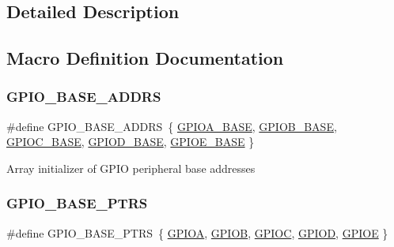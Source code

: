 \subsection{Detailed Description}


\subsection{Macro Definition Documentation}
\mbox{\label{group___g_p_i_o___register___masks_ga7f97513de5235b3600dc07bf327fe315}} 
\subsubsection{\texorpdfstring{G\+P\+I\+O\+\_\+\+B\+A\+S\+E\+\_\+\+A\+D\+D\+RS}{GPIO\_BASE\_ADDRS}}
{\footnotesize\ttfamily \#define G\+P\+I\+O\+\_\+\+B\+A\+S\+E\+\_\+\+A\+D\+D\+RS~\{ \mbox{\hyperlink{group___g_p_i_o___register___masks_gad7723846cc5db8e43a44d78cf21f6efa}{G\+P\+I\+O\+A\+\_\+\+B\+A\+SE}}, \mbox{\hyperlink{group___g_p_i_o___register___masks_gac944a89eb789000ece920c0f89cb6a68}{G\+P\+I\+O\+B\+\_\+\+B\+A\+SE}}, \mbox{\hyperlink{group___g_p_i_o___register___masks_ga26f267dc35338eef219544c51f1e6b3f}{G\+P\+I\+O\+C\+\_\+\+B\+A\+SE}}, \mbox{\hyperlink{group___g_p_i_o___register___masks_ga1a93ab27129f04064089616910c296ec}{G\+P\+I\+O\+D\+\_\+\+B\+A\+SE}}, \mbox{\hyperlink{group___g_p_i_o___register___masks_gab487b1983d936c4fee3e9e88b95aad9d}{G\+P\+I\+O\+E\+\_\+\+B\+A\+SE}} \}}

Array initializer of G\+P\+IO peripheral base addresses \mbox{\label{group___g_p_i_o___register___masks_gad0f7206167a584b1e75a81a5c30fa1c2}} 
\subsubsection{\texorpdfstring{G\+P\+I\+O\+\_\+\+B\+A\+S\+E\+\_\+\+P\+T\+RS}{GPIO\_BASE\_PTRS}}
{\footnotesize\ttfamily \#define G\+P\+I\+O\+\_\+\+B\+A\+S\+E\+\_\+\+P\+T\+RS~\{ \mbox{\hyperlink{group___g_p_i_o___register___masks_gac485358099728ddae050db37924dd6b7}{G\+P\+I\+OA}}, \mbox{\hyperlink{group___g_p_i_o___register___masks_ga68b66ac73be4c836db878a42e1fea3cd}{G\+P\+I\+OB}}, \mbox{\hyperlink{group___g_p_i_o___register___masks_ga2dca03332d620196ba943bc2346eaa08}{G\+P\+I\+OC}}, \mbox{\hyperlink{group___g_p_i_o___register___masks_ga7580b1a929ea9df59725ba9c18eba6ac}{G\+P\+I\+OD}}, \mbox{\hyperlink{group___g_p_i_o___register___masks_gae04bdb5e8acc47cab1d0532e6b0d0763}{G\+P\+I\+OE}} \}}

